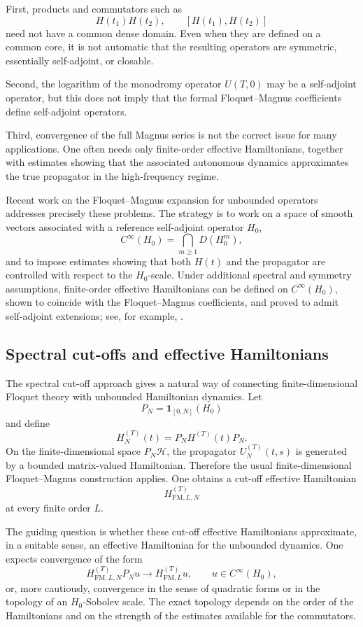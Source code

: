 \documentclass[11pt]{amsart}
\theoremstyle{plain}
\theoremstyle{definition}
\theoremstyle{remark}
\newcommand{\Hilb}{\mathcal H}
\begin{document}
First, products and commutators such as
\[
        H(t_1)H(t_2),
        \qquad
        [H(t_1),H(t_2)]
\]
need not have a common dense domain.  Even when they are defined on a
common core, it is not automatic that the resulting operators are
symmetric, essentially self-adjoint, or closable.

Second, the logarithm of the monodromy operator \(U(T,0)\) may be a
self-adjoint operator, but this does not imply that the formal
Floquet--Magnus coefficients define self-adjoint operators.

Third, convergence of the full Magnus series is not the correct issue
for many applications.  One often needs only finite-order effective
Hamiltonians, together with estimates showing that the associated
autonomous dynamics approximates the true propagator in the
high-frequency regime.

Recent work on the Floquet--Magnus expansion for unbounded operators
addresses precisely these problems.  The strategy is to work on a space
of smooth vectors associated with a reference self-adjoint operator
\(H_0\),
\[
        C^\infty(H_0)=\bigcap_{m\geq1}D(H_0^m),
\]
and to impose estimates showing that both \(H(t)\) and the propagator
are controlled with respect to the \(H_0\)-scale.  Under additional
spectral and symmetry assumptions, finite-order effective Hamiltonians
can be defined on \(C^\infty(H_0)\), shown to coincide with the
Floquet--Magnus coefficients, and proved to admit self-adjoint
extensions; see, for example,
\cite{BurgarthHillierLonigroRichter2026}.

\subsection{Spectral cut-offs and effective Hamiltonians}

The spectral cut-off approach gives a natural way of connecting
finite-dimensional Floquet theory with unbounded Hamiltonian dynamics.
Let
\[
        P_N=\mathbf 1_{[0,N]}(H_0)
\]
and define
\[
        H_N^{(T)}(t)=P_NH^{(T)}(t)P_N.
\]
On the finite-dimensional space \(P_N\Hilb\), the propagator
\(U_N^{(T)}(t,s)\) is generated by a bounded matrix-valued Hamiltonian.
Therefore the usual finite-dimensional Floquet--Magnus construction
applies.  One obtains a cut-off effective Hamiltonian
\[
        H_{\mathrm{FM},L,N}^{(T)}
\]
at every finite order \(L\).

The guiding question is whether these cut-off effective Hamiltonians
approximate, in a suitable sense, an effective Hamiltonian for the
unbounded dynamics.  One expects convergence of the form
\[
        H_{\mathrm{FM},L,N}^{(T)}P_Nu
        \longrightarrow
        H_{\mathrm{FM},L}^{(T)}u,
        \qquad
        u\in C^\infty(H_0),
\]
or, more cautiously, convergence in the sense of quadratic forms or in
the topology of an \(H_0\)-Sobolev scale.  The exact topology depends on
the order of the Hamiltonians and on the strength of the estimates
available for the commutators.
\end{document}
